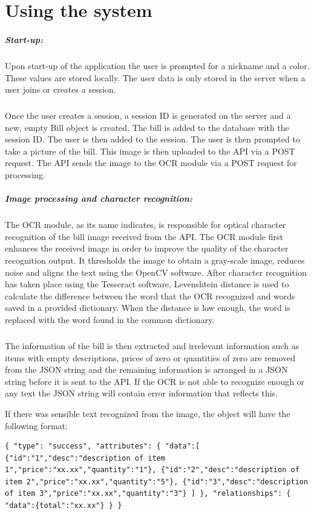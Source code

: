 \documentclass[12pt,a4paper]{article}
\begin{document}
\section{Using the system}
\subparagraph{Start-up: }
Upon start-up of the application the user is prompted for a nickname and a color. These values are stored locally. The user data is only stored in the server when a user joins or creates a session.  
\subparagraph{}
Once the user creates a session, a session ID is generated on the server and a new, empty Bill object is created. The bill is added to the database with the session ID. The user is then added to the session. The user is then prompted to take a picture of the bill. This image is then uploaded to the API via a POST request. The API sends the image to the OCR module via a POST request for processing. 
\subparagraph{Image processing and character recognition: }
The OCR module, as its name indicates, is responsible for optical character recognition of the bill image received from the API. The OCR module first enhances the received image in order to improve the quality of the character recognition output. It thresholds the image to obtain a gray-scale image, reduces noise and aligns the text using the OpenCV software. After character recognition has taken place using the Tesseract software, Levenshtein distance is used to calculate the difference between the word that the OCR recognized and words saved in a provided dictionary. When the distance is low enough, the word is replaced with the word found in the common dictionary.
\subparagraph{} The information of the bill is then extracted and irrelevant information such as items with empty descriptions, prices of zero or quantities of zero are removed from the JSON string and the remaining information is arranged in a JSON string before it is sent to the API. If the OCR is not able to recognize enough or any text the JSON string will contain error information that reflects this. 
\hspace{1cm}

If there was sensible text recognized from the image, the object will have the following format:

\begin{lstlisting}
{ "type": "success", "attributes": { "data":[ {"id":"1","desc":"description of item 1","price":"xx.xx","quantity":"1"}, {"id":"2","desc":"description of item 2","price":"xx.xx","quantity":"5"}, {"id":"3","desc":"description of item 3","price":"xx.xx","quantity":"3"} ] }, "relationships": { "data":{total":"xx.xx"} } }
\end{lstlisting}
\end{document}
